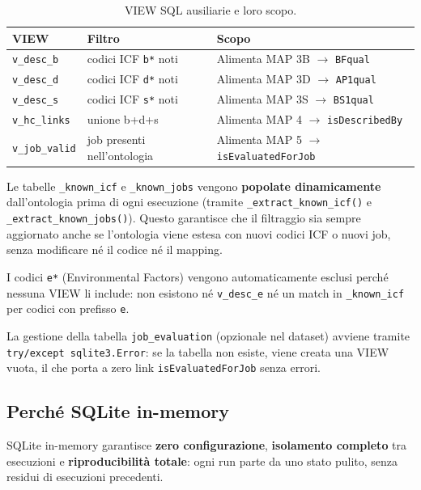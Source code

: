 \documentclass[a4paper,12pt]{article}
\begin{document}
\noindent \begin{table}[H]
\centering\small
\caption{VIEW SQL ausiliarie e loro scopo.}
\begin{tabular}{L{3cm} L{3.5cm} L{6cm}}
\toprule
\textbf{VIEW} & \textbf{Filtro} & \textbf{Scopo} \\
\midrule
\texttt{v\_desc\_b} & codici ICF \texttt{b*} noti & Alimenta MAP 3B $\rightarrow$ \texttt{BFqual} \\
\texttt{v\_desc\_d} & codici ICF \texttt{d*} noti & Alimenta MAP 3D $\rightarrow$ \texttt{AP1qual} \\
\texttt{v\_desc\_s} & codici ICF \texttt{s*} noti & Alimenta MAP 3S $\rightarrow$ \texttt{BS1qual} \\
\texttt{v\_hc\_links} & unione b+d+s & Alimenta MAP 4 $\rightarrow$ \texttt{isDescribedBy} \\
\texttt{v\_job\_valid} & job presenti nell'ontologia & Alimenta MAP 5 $\rightarrow$ \texttt{isEvaluatedForJob} \\
\bottomrule
\end{tabular}
\end{table}

Le tabelle \texttt{\_known\_icf} e \texttt{\_known\_jobs} vengono
\textbf{popolate dinamicamente} dall'ontologia prima di ogni esecuzione
(tramite \texttt{\_extract\_known\_icf()} e \texttt{\_extract\_known\_jobs()}).
Questo garantisce che il filtraggio sia sempre aggiornato anche se
l'ontologia viene estesa con nuovi codici ICF o nuovi job, senza modificare
n\'{e} il codice n\'{e} il mapping.

I codici \texttt{e*} (Environmental Factors) vengono automaticamente
esclusi perch\'{e} nessuna VIEW li include: non esistono n\'{e}
\texttt{v\_desc\_e} n\'{e} un match in \texttt{\_known\_icf} per
codici con prefisso \texttt{e}.

La gestione della tabella \texttt{job\_evaluation} (opzionale nel dataset)
avviene tramite \texttt{try/except sqlite3.Error}: se la tabella non
esiste, viene creata una VIEW vuota, il che porta a zero link
\texttt{isEvaluatedForJob} senza errori.

\subsection{Perch\'{e} SQLite in-memory}

\begin{infobox}
SQLite in-memory garantisce \textbf{zero configurazione}, \textbf{isolamento
completo} tra esecuzioni e \textbf{riproducibilit\`{a} totale}: ogni run
parte da uno stato pulito, senza residui di esecuzioni precedenti.
\end{infobox}
\end{document}
